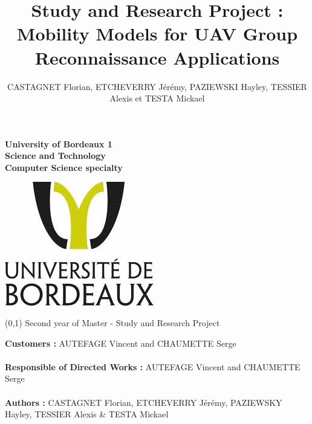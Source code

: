 \documentclass[12pt,a4paper]{article}
\author{CASTAGNET Florian, ETCHEVERRY Jérémy, PAZIEWSKI Hayley, TESSIER Alexis et TESTA Mickael}
\title{Study and Research Project : Mobility Models for UAV Group Reconnaissance Applications}
\begin{document}
\thispagestyle{empty}
\setcounter{page}{0}

\begin{minipage}{0.5\linewidth}
\begin{flushleft}
\textbf{University of Bordeaux 1 \\Science and Technology \\Computer Science specialty}\\ 
\end{flushleft}
\end{minipage}
\begin{minipage}{0.5\linewidth}
\begin{flushright}
\includegraphics[scale = 0.4]{../images/logo}
\end{flushright}
\end{minipage}

\vspace{4cm}

\begin{center}
\boxput*(0,1){
\colorbox{white}{Second year of Master - Study and Research Project}
}
{
\setlength{\fboxsep}{12pt} 
}


\end{center}


\vspace{4cm}


\noindent
\begin{center}

\textbf{Customers :} AUTEFAGE Vincent and CHAUMETTE Serge\\~\\
\textbf{Responsible of Directed Works :} AUTEFAGE Vincent and CHAUMETTE Serge\\~\\
\vspace{4cm}
\textbf{Authors :} CASTAGNET Florian, ETCHEVERRY Jérémy, PAZIEWSKY Hayley, TESSIER Alexis \& TESTA Mickael\\
\end{center}
\newpage
\thispagestyle{empty}
\setcounter{page}{0}
\end{document}
